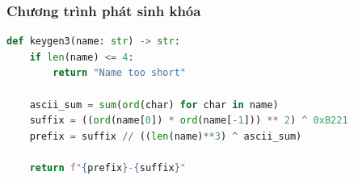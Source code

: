 \subsubsection{Chương trình phát sinh khóa}
\begin{lstlisting}[language=Python] 
def keygen3(name: str) -> str:
    if len(name) <= 4:
        return "Name too short"

    ascii_sum = sum(ord(char) for char in name)
    suffix = ((ord(name[0]) * ord(name[-1])) ** 2) ^ 0xB221
    prefix = suffix // ((len(name)**3) ^ ascii_sum)

    return f"{prefix}-{suffix}"
\end{lstlisting}